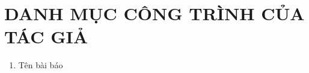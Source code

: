 \chapter*{DANH MỤC CÔNG TRÌNH CỦA TÁC GIẢ}
\label{publish}

\begin{enumerate}
\item Tên bài báo

\end{enumerate}